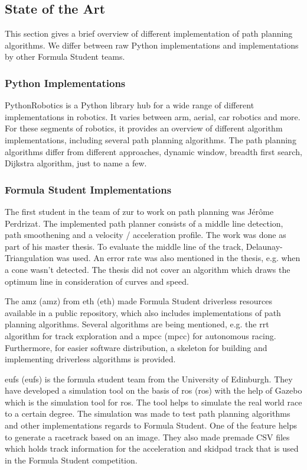 \subsection{State of the Art}
This section gives a brief overview of different implementation of path planning algorithms. We differ between raw Python implementations and implementations by other Formula Student teams.

\subsubsection{Python Implementations}
PythonRobotics is a Python library hub for a wide range of different implementations in robotics. It varies between arm, aerial, car robotics and more.
For these segments of robotics, it provides an overview of different algorithm implementations, including several path planning algorithms.
The path planning algorithms differ from different approaches, dynamic window, breadth first search, Dijkstra algorithm, just to name a few. 
\cite{python_robotics}

\subsubsection{Formula Student Implementations}
The first student in the team of \acrlong{zur} to work on path planning was Jérôme Perdrizat. The implemented path planner consists of a middle line detection, path smoothening and a velocity / acceleration profile. The work was done as part of his master thesis. To evaluate the middle line of the track, Delaunay-Triangulation was used. An error rate was also mentioned in the thesis, e.g. when a cone wasn't detected. The thesis did not cover an algorithm which draws the optimum line in consideration of curves and speed.
\cite{autopilot_for_formula_student_jerome}

The \acrshort{amz} (\acrlong{amz}) from \acrshort{eth} (\acrlong{eth}) made Formula Student driverless resources available in a public repository, which also includes implementations of path planning algorithms. Several algorithms are being mentioned, e.g. the \acrshort{rrt} algorithm for track exploration and a \acrlong{mpcc} (\acrshort{mpcc}) for autonomous racing. Furthermore, for easier software distribution, a skeleton for building and implementing driverless algorithms is provided.
\cite{amz_racing_github}

\acrshort{eufs} (\acrlong{eufs}) is the formula student team from the University of Edinburgh. They have developed a simulation tool on the basis of \acrshort{ros} (\acrlong{ros}) with the help of Gazebo which is the simulation tool for \acrshort{ros}. The tool helps to simulate the real world race to a certain degree. The simulation was made to test path planning algorithms and other implementations regards to Formula Student. One of the feature helps to generate a racetrack based on an image. They also made premade CSV files which holds track information for the acceleration and skidpad track that is used in the Formula Student competition.
\cite{eufs_sim_gitlab}

